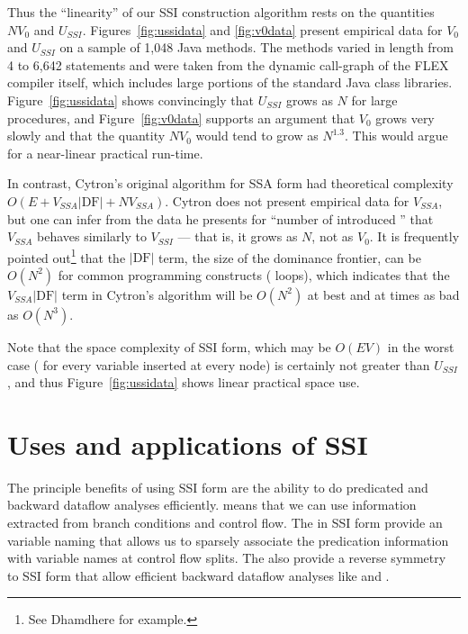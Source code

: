 \documentclass[12pt,titlepage,twoside]{article}
\let\oldsection\section
\renewcommand{\section}{\setcounter{figure}{0}\setcounter{table}{0}\oldsection}
\begin{document}
Thus the ``linearity'' of our SSI construction algorithm rests on the
quantities $N V_0$ and $U_{SSI}$.  Figures~\ref{fig:ussidata} and
\ref{fig:v0data} present empirical data for $V_0$ and $U_{SSI}$ on a
sample of 1,048 Java methods.  The methods varied in length from 4
to 6,642 statements and were taken from the dynamic call-graph of the
FLEX compiler itself, which includes large portions of the standard
Java class libraries.  Figure~\ref{fig:ussidata} shows convincingly
that $U_{SSI}$ grows as $N$ for large procedures, and
Figure~\ref{fig:v0data} supports an argument that $V_0$ grows very
slowly and that the quantity $N V_0$ would tend to grow as $N^{1.3}$.
This would argue for a near-linear practical run-time.

In contrast, Cytron's original algorithm for SSA form had theoretical
complexity $O(E + V_{SSA} |\text{DF}| + N V_{SSA})$.  Cytron does not
present empirical data for $V_{SSA}$, but one can infer from the data
he presents for ``number of introduced '' that
$V_{SSA}$ behaves similarly to $V_{SSI}$ --- that is, it grows as $N$,
not as $V_0$.  It is frequently pointed out\footnote{See Dhamdhere
\cite{dhamdhere92:large} for example.} that the $|\text{DF}|$
term, the size of the dominance frontier, can be $O(N^2)$ for common
programming constructs ( loops), which indicates that
the $V_{SSA} |\text{DF}|$ term in Cytron's algorithm will be $O(N^2)$
at best and at times as bad as $O(N^3)$.

Note that the space complexity of SSI form, which may be $O(EV)$ in
the worst case ( for every variable inserted at
every node) is certainly not greater than $U_{SSI}$, and thus
Figure~\ref{fig:ussidata} shows linear practical space use.

\section{Uses and applications of SSI}
The principle benefits of using SSI form are the ability to do
predicated and backward dataflow analyses efficiently.
 means that we can use information
extracted from branch conditions and control flow.  The
 in SSI form provide an variable naming that
allows us to sparsely associate the predication information with
variable names at control flow splits.  The  also
provide a reverse symmetry to SSI form that allow efficient backward
dataflow analyses like  and
.
\end{document}
